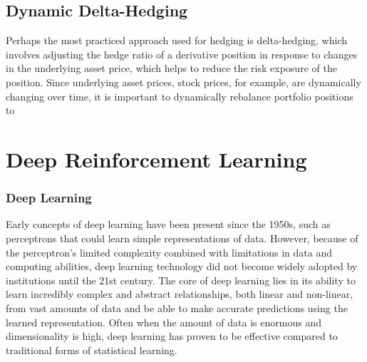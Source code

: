 \subsection{Dynamic Delta-Hedging}

Perhaps the most practiced approach used for hedging is delta-hedging, which involves adjusting the hedge ratio of a derivative position in response to changes in the underlying asset price, which helps to reduce the risk exposure of the position. Since underlying asset prices, stock prices, for example, are dynamically changing over time, it is important to dynamically rebalance portfolio positions to 

\section{Deep Reinforcement Learning}

\subsubsection{Deep Learning}
Early concepts of deep learning have been present since the 1950s, such as perceptrons that could learn simple representations of data. However, because of the perceptron's limited complexity combined with limitations in data and computing abilities, deep learning technology did not become widely adopted by institutions until the 21st century. The core of deep learning lies in its ability to learn incredibly complex and abstract relationships, both linear and non-linear, from vast amounts of data and be able to make accurate predictions using the learned representation. Often when the amount of data is enormous and dimensionality is high, deep learning has proven to be effective compared to traditional forms of statistical learning.

